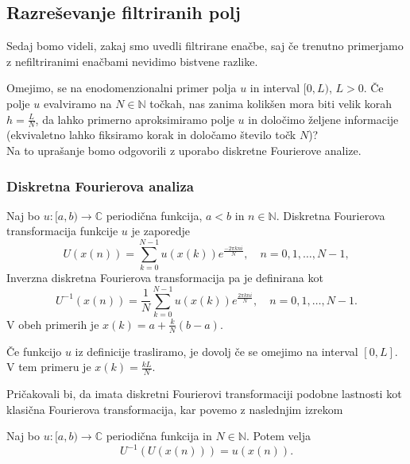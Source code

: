 \documentclass[mat2, tisk]{fmfdelo}
\newcommand{\N}{\mathbb N}
\newcommand{\C}{\mathbb C}
\begin{document}
\subsection{Razreševanje filtriranih polj}

Sedaj bomo videli, zakaj smo uvedli filtrirane enačbe, saj če 
trenutno primerjamo z nefiltriranimi enačbami nevidimo bistvene razlike.

Omejimo, se na enodomenzionalni primer polja $u$ in interval $[0, L)$, 
$L > 0$. Če polje $u$ evalviramo na $N \in \N$ točkah, nas zanima 
kolikšen mora biti velik korah $h = \frac{L}{N}$, da lahko primerno aproksimiramo 
polje $u$ in določimo željene informacije (ekvivaletno lahko fiksiramo 
korak in določamo število točk $N$)? \\
Na to uprašanje bomo odgovorili z uporabo diskretne Fourierove analize. 

\subsubsection{Diskretna Fourierova analiza}

\begin{definicija}
Naj bo $u: [a, b) \rightarrow \C$ periodična funkcija, $a < b$ in $n\in \N$. 
Diskretna Fourierova transformacija funkcije $u$ je zaporedje 
\begin{equation}
U(x(n)) = \sum_{k=0}^{N-1} u(x(k)) e^{\frac{-2\pi k n i}{N}}, \quad n = 0, 1, \dots, N-1,
\end{equation}
Inverzna diskretna Fourierova
transformacija pa je definirana kot 
\begin{equation}
  U^{-1}(x(n)) = \frac{1}{N}\sum_{k=0}^{N-1} u(x(k)) e^{\frac{2\pi k n i}{N}}, \quad n = 0, 1, \dots, N-1.
\end{equation}
V obeh primerih je $x(k) = a + \frac{k}{N}(b-a)$.
\end{definicija}

\begin{opomba}
Če funkcijo $u$ iz definicije trasliramo, je dovolj če se 
omejimo na interval $[0, L]$. V tem primeru je $x(k) = \frac{kL}{N}$.
\end{opomba}

Pričakovali bi, da imata diskretni Fourierovi transformaciji podobne 
lastnosti kot klasična Fourierova transformacija, kar povemo z naslednjim izrekom 

\begin{izrek}
Naj bo $u: [a, b) \rightarrow \C$ periodična funkcija in $N\in \N$. Potem velja
\begin{equation}
U^{-1}(U(x(n))) = u(x(n)).
\end{equation}
\end{izrek}
\end{document}
